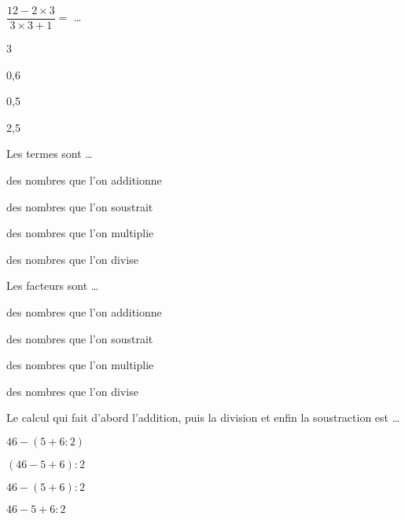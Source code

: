 \begin{QCM}
\begin{GroupeQCM}
\begin{exercice}
      $\dfrac{12 - 2 \times 3}{3 \times 3 + 1} =$ \ldots
      \begin{ChoixQCM}{4}
      \item 3
      \item 0,6
      \item 0,5
      \item 2,5
      \end{ChoixQCM}
\begin{corrige}
   \end{corrige}
    \end{exercice}
    
\begin{exercice}
      Les termes sont \ldots
      \begin{ChoixQCM}{4}
      \item des nombres que l'on additionne
      \item des nombres que l'on soustrait
      \item des nombres que l'on multiplie
      \item des nombres que l'on divise
      \end{ChoixQCM}
\begin{corrige}
   \end{corrige}
    \end{exercice}
    
\begin{exercice}
      Les facteurs sont \ldots
      \begin{ChoixQCM}{4}
      \item des nombres que l'on additionne
      \item des nombres que l'on soustrait
      \item des nombres que l'on multiplie
      \item des nombres que l'on divise
      \end{ChoixQCM}
\begin{corrige}
   \end{corrige}
    \end{exercice}
    
\begin{exercice}
      Le calcul qui fait d'abord  l'addition, puis la division et enfin la soustraction est \ldots
      \begin{ChoixQCM}{4}
      \item $46 - (5 + 6 : 2)$
      \item $(46 - 5 + 6) : 2$
      \item $46 - (5 + 6) : 2$
      \item $46 - 5 + 6 : 2$
      \end{ChoixQCM}
\begin{corrige}
   \end{corrige}
    \end{exercice}
    

\end{GroupeQCM}
\end{QCM}
